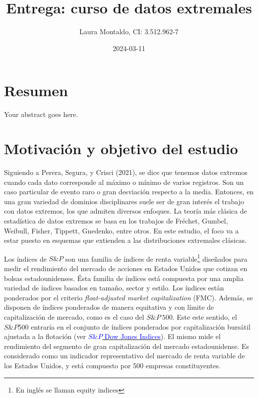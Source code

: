 \documentclass[
  oneside]{article}
\title{Entrega: curso de datos extremales}
\author{Laura Montaldo, CI: 3.512.962-7}
\date{2024-03-11}
\begin{document}
\maketitle

\newtheorem{theorem}{Teorema}[section]

\newpage

\thispagestyle{empty}

\maketitle

\newpage

\tableofcontents

\newpage

\hypertarget{resumen}{%
\section{Resumen}\label{resumen}}

Your abstract goes here.

\newpage

\section{Motivación y objetivo del estudio}

Siguiendo a Perera, Segura, y Crisci (2021), se dice que tenemos datos
extremos cuando cada dato corresponde al máximo o mínimo de varios
registros. Son un caso particular de evento raro o gran desviación
respecto a la media. Entonces, en una gran variedad de dominios
disciplinares suele ser de gran interés el trabajo con datos extremos,
los que admiten diversos enfoques. La teoría más clásica de estadística
de datos extremos se basa en los trabajos de Fréchet, Gumbel, Weibull,
Fisher, Tippett, Gnedenko, entre otros. En este estudio, el foco va a
estar puesto en esquemas que extienden a las distribuciones extremales
clásicas.

Los índices de \(S\&P\) son una familia de índices de renta
variable\footnote{En inglés se llaman equity indices} diseñados para
medir el rendimiento del mercado de acciones en Estados Unidos que
cotizan en bolsas estadounidenses. Ésta familia de índices está
compuesta por una amplia variedad de índices basados en tamaño, sector y
estilo. Los índices están ponderados por el criterio
\textit{float-adjusted market capitalization} (FMC). Además, se disponen
de índices ponderados de manera equitativa y con límite de
capitalización de mercado, como es el caso del \(S\&P\:500\). Este este
sentido, el \(S\&P 500\) entraría en el conjunto de índices ponderados
por capitalización bursátil ajustada a la flotación (ver
\href{http://www.overleaf.com}{\textcolor{blue}{$S\&P$ Dow Jones Indices}}).
El mismo mide el rendimiento del segmento de gran capitalización del
mercado estadounidense. Es considerado como un indicador representativo
del mercado de renta variable de los Estados Unidos, y está compuesto
por 500 empresas constituyentes.
\end{document}
